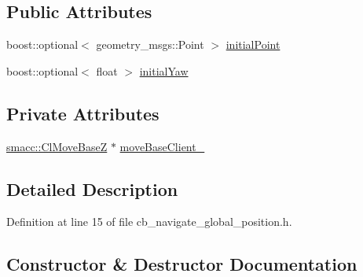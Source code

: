 \subsection*{Public Attributes}
\begin{DoxyCompactItemize}
\item 
boost\+::optional$<$ geometry\+\_\+msgs\+::\+Point $>$ \hyperlink{classsm__dance__bot_1_1move__base__z__client_1_1CbNavigateGlobalPosition_a7e8224311686be554d68853ff757be5d}{initial\+Point}
\item 
boost\+::optional$<$ float $>$ \hyperlink{classsm__dance__bot_1_1move__base__z__client_1_1CbNavigateGlobalPosition_a2466eeabb6e2a3f35427a444a369d45e}{initial\+Yaw}
\end{DoxyCompactItemize}
\subsection*{Private Attributes}
\begin{DoxyCompactItemize}
\item 
\hyperlink{classsmacc_1_1ClMoveBaseZ}{smacc\+::\+Cl\+Move\+BaseZ} $\ast$ \hyperlink{classsm__dance__bot_1_1move__base__z__client_1_1CbNavigateGlobalPosition_a579eaa06b93cc396b2ff615a786c495f}{move\+Base\+Client\+\_\+}
\end{DoxyCompactItemize}


\subsection{Detailed Description}


Definition at line 15 of file cb\+\_\+navigate\+\_\+global\+\_\+position.\+h.



\subsection{Constructor \& Destructor Documentation}
